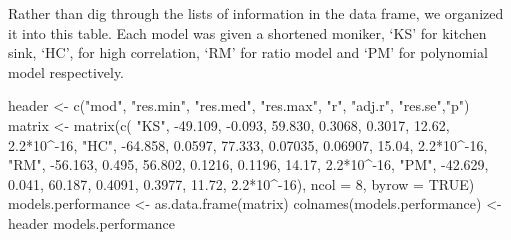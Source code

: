 \documentclass[
]{article}
\newenvironment{Shaded}{\begin{snugshade}}{\end{snugshade}}
\newcommand{\AttributeTok}[1]{\textcolor[rgb]{0.77,0.63,0.00}{#1}}
\newcommand{\ConstantTok}[1]{\textcolor[rgb]{0.00,0.00,0.00}{#1}}
\newcommand{\DecValTok}[1]{\textcolor[rgb]{0.00,0.00,0.81}{#1}}
\newcommand{\FloatTok}[1]{\textcolor[rgb]{0.00,0.00,0.81}{#1}}
\newcommand{\FunctionTok}[1]{\textcolor[rgb]{0.00,0.00,0.00}{#1}}
\newcommand{\NormalTok}[1]{#1}
\newcommand{\OtherTok}[1]{\textcolor[rgb]{0.56,0.35,0.01}{#1}}
\newcommand{\SpecialCharTok}[1]{\textcolor[rgb]{0.00,0.00,0.00}{#1}}
\newcommand{\StringTok}[1]{\textcolor[rgb]{0.31,0.60,0.02}{#1}}
\begin{document}
Rather than dig through the lists of information in the data frame, we
organized it into this table. Each model was given a shortened moniker,
`KS' for kitchen sink, `HC', for high correlation, `RM' for ratio model
and `PM' for polynomial model respectively.

\begin{Shaded}
\begin{Highlighting}[]
\NormalTok{header }\OtherTok{\textless{}{-}} \FunctionTok{c}\NormalTok{(}\StringTok{"mod"}\NormalTok{, }\StringTok{"res.min"}\NormalTok{, }\StringTok{"res.med"}\NormalTok{, }\StringTok{"res.max"}\NormalTok{, }\StringTok{"r"}\NormalTok{, }\StringTok{"adj.r"}\NormalTok{, }\StringTok{"res.se"}\NormalTok{,}\StringTok{"p"}\NormalTok{)}
\NormalTok{matrix }\OtherTok{\textless{}{-}} \FunctionTok{matrix}\NormalTok{(}\FunctionTok{c}\NormalTok{(}
  \StringTok{"KS"}\NormalTok{, }\SpecialCharTok{{-}}\FloatTok{49.109}\NormalTok{, }\SpecialCharTok{{-}}\FloatTok{0.093}\NormalTok{, }\FloatTok{59.830}\NormalTok{, }\FloatTok{0.3068}\NormalTok{, }\FloatTok{0.3017}\NormalTok{, }\FloatTok{12.62}\NormalTok{, }\FloatTok{2.2}\SpecialCharTok{*}\DecValTok{10}\SpecialCharTok{\^{}{-}}\DecValTok{16}\NormalTok{, }
  \StringTok{"HC"}\NormalTok{, }\SpecialCharTok{{-}}\FloatTok{64.858}\NormalTok{, }\FloatTok{0.0597}\NormalTok{, }\FloatTok{77.333}\NormalTok{, }\FloatTok{0.07035}\NormalTok{, }\FloatTok{0.06907}\NormalTok{, }\FloatTok{15.04}\NormalTok{, }\FloatTok{2.2}\SpecialCharTok{*}\DecValTok{10}\SpecialCharTok{\^{}{-}}\DecValTok{16}\NormalTok{, }
  \StringTok{"RM"}\NormalTok{, }\SpecialCharTok{{-}}\FloatTok{56.163}\NormalTok{, }\FloatTok{0.495}\NormalTok{, }\FloatTok{56.802}\NormalTok{, }\FloatTok{0.1216}\NormalTok{, }\FloatTok{0.1196}\NormalTok{, }\FloatTok{14.17}\NormalTok{, }\FloatTok{2.2}\SpecialCharTok{*}\DecValTok{10}\SpecialCharTok{\^{}{-}}\DecValTok{16}\NormalTok{, }
  \StringTok{"PM"}\NormalTok{, }\SpecialCharTok{{-}}\FloatTok{42.629}\NormalTok{, }\FloatTok{0.041}\NormalTok{, }\FloatTok{60.187}\NormalTok{, }\FloatTok{0.4091}\NormalTok{, }\FloatTok{0.3977}\NormalTok{, }\FloatTok{11.72}\NormalTok{, }\FloatTok{2.2}\SpecialCharTok{*}\DecValTok{10}\SpecialCharTok{\^{}{-}}\DecValTok{16}\NormalTok{), }\AttributeTok{ncol =} \DecValTok{8}\NormalTok{,  }\AttributeTok{byrow =} \ConstantTok{TRUE}\NormalTok{)}
\NormalTok{models.performance }\OtherTok{\textless{}{-}} \FunctionTok{as.data.frame}\NormalTok{(matrix)}
\FunctionTok{colnames}\NormalTok{(models.performance) }\OtherTok{\textless{}{-}}\NormalTok{ header}
\NormalTok{models.performance}
\end{Highlighting}
\end{Shaded}
\end{document}
